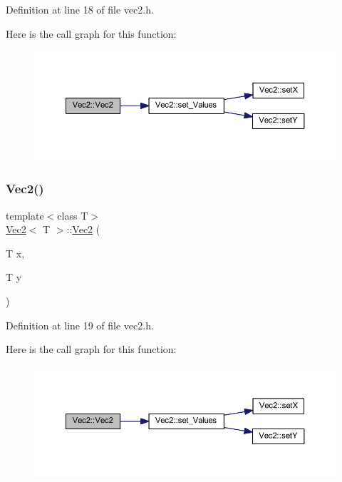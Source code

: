 Definition at line 18 of file vec2.\+h.

Here is the call graph for this function\+:
\nopagebreak
\begin{figure}[H]
\begin{center}
\leavevmode
\includegraphics[width=350pt]{class_vec2_a0d51ef92a3baedc006bca6a702cefc65_cgraph}
\end{center}
\end{figure}
\mbox{\label{class_vec2_a43581c2c510e3731cbe9f49a328d73b9}} 
\subsubsection{\texorpdfstring{Vec2()}{Vec2()}\hspace{0.1cm}{\footnotesize\ttfamily [2/5]}}
{\footnotesize\ttfamily template$<$class T$>$ \\
\mbox{\hyperlink{class_vec2}{Vec2}}$<$ T $>$\+::\mbox{\hyperlink{class_vec2}{Vec2}} (\begin{DoxyParamCaption}\item[{T}]{x,  }\item[{T}]{y }\end{DoxyParamCaption})\hspace{0.3cm}{\ttfamily [inline]}}



Definition at line 19 of file vec2.\+h.

Here is the call graph for this function\+:
\nopagebreak
\begin{figure}[H]
\begin{center}
\leavevmode
\includegraphics[width=350pt]{class_vec2_a43581c2c510e3731cbe9f49a328d73b9_cgraph}
\end{center}
\end{figure}
\mbox{\label{class_vec2_af8b050d3183cdd021678f51f72462726}} 
